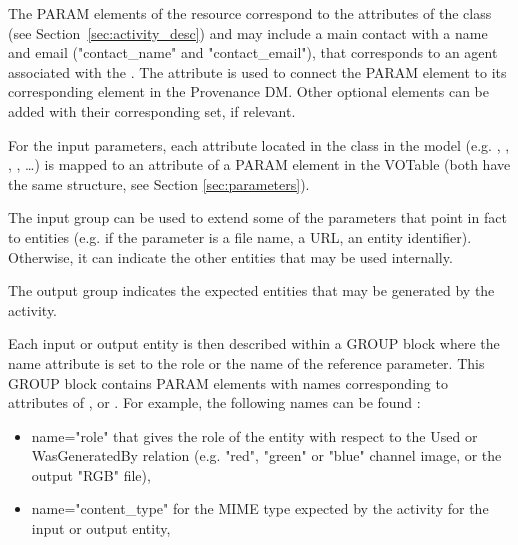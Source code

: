 The PARAM elements of the resource correspond to the attributes of the  class (see Section~\ref{sec:activity_desc}) and may include a main contact with a name and email ("contact\_name" and "contact\_email"), that corresponds to an agent associated with the .
The  attribute is used to connect the PARAM element to its corresponding element in the Provenance DM. Other optional elements can be added with their corresponding  set, if relevant.

For the input parameters, each attribute located in the  class in the model (e.g. , , , , \dots) is mapped to an attribute of a PARAM element in the VOTable (both have the same structure, see Section \ref{sec:parameters}).

The input group can be used to extend some of the parameters that point in fact to entities (e.g. if the parameter is a file name, a URL, an entity identifier).
Otherwise, it can indicate the other entities that may be used internally.

The output group indicates the expected entities that may be generated by the activity.

Each input or output entity is then described within a GROUP block where the name attribute is set to the role or the name of the reference parameter. 
This GROUP block contains PARAM elements with names corresponding to attributes of ,  or .
For example, the following names can be found :
\begin{itemize}
 \item name="role" that gives the role of the entity with respect to the Used or WasGeneratedBy relation (e.g. "red", "green" or "blue" channel image, or the output "RGB" file),
 \item name="content\_type" for the MIME type expected by the activity for the input or output entity,
 \end{itemize} 


